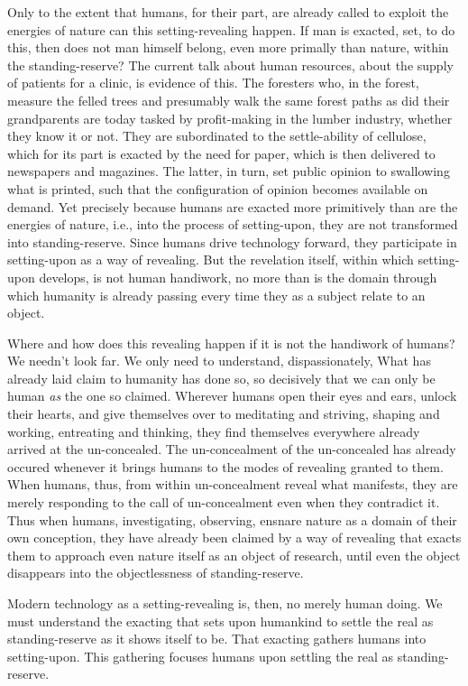 \documentclass[paper=a4, fontsize=11pt,twoside]{scrartcl}
\begin{document}
Only to the extent that humans, for their part, are already called to exploit the energies of nature can this setting-revealing happen. If man is exacted, set, to do this, then does not man himself belong, even more primally than nature, within the standing-reserve? The current talk about human resources, about the supply of patients for a clinic, is evidence of this. The foresters who, in the forest, measure the felled trees and presumably walk the same forest paths as did their grandparents are today tasked by profit-making in the lumber industry, whether they know it or not. They are subordinated to the settle-ability of cellulose, which for its part is exacted by the need for paper, which is then delivered to newspapers and magazines. The latter, in turn, set public opinion to swallowing what is printed, such that the configuration of opinion becomes available on demand. Yet precisely because humans are exacted more primitively than are the energies of nature, i.e., into the process of setting-upon, they are not transformed into standing-reserve. Since humans drive technology forward, they participate in setting-upon as a way of revealing. But the revelation itself, within which setting-upon develops, is not human handiwork, no more than is the domain through which humanity is already passing every time they as a subject relate to an object.

Where and how does this revealing happen if it is not the handiwork of humans? We needn't look far. We only need to understand, dispassionately, What has already laid claim to humanity has done so, so decisively that we can only be human \textit{as} the one so claimed. Wherever humans open their eyes and ears, unlock their hearts, and give themselves over to meditating and striving, shaping and working, entreating and thinking, they find themselves everywhere already arrived at the un-concealed. The un-concealment of the un-concealed has already occured whenever it brings humans to the modes of revealing granted to them. When humans, thus, from within un-concealment reveal what manifests, they are merely responding to the call of un-concealment even when they contradict it. Thus when humans, investigating, observing, ensnare nature as a domain of their own conception, they have already been claimed by a way of revealing that exacts them to approach even nature itself as an object of research, until even the object disappears into the objectlessness of standing-reserve.

Modern technology as a setting-revealing is, then, no merely human doing. We must understand the exacting that sets upon humankind to settle the real as standing-reserve as it shows itself to be. That exacting gathers humans into setting-upon. This gathering focuses humans upon settling the real as standing-reserve.
\end{document}
